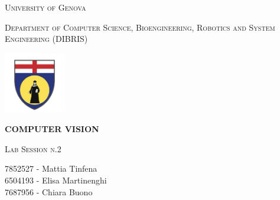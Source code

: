 \begin{titlepage}
    \centering
    {\scshape\large University of Genova \par}
    \vspace{0.3cm}
    {\scshape\large Department of Computer Science, Bioengineering, Robotics and System Engineering (DIBRIS) \par}
    \vspace{0.3cm}
    \includegraphics[width=0.2\textwidth]{mainmatter/Images/Unige-logo.jpeg}\\[0.3cm]
    {\LARGE\bfseries COMPUTER VISION \par}
    \vfill
    {\scshape\large Lab Session n.2 \par}
    \vfill
    
    \begin{minipage}[t]{0.45\textwidth}
        \begin{flushleft} \large
            7852527 - Mattia Tinfena\\
            6504193 - Elisa Martinenghi\\
            7687956 - Chiara Buono
        \end{flushleft}
    \end{minipage}
    \vfill

    \tableofcontents  %
    \vspace{1cm}
    \listoffigures  %

\end{titlepage}
